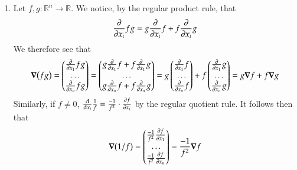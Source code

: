 \documentclass[12pt]{article}
\theoremstyle{definitionstyle}
\def\mbb#1{\mathbb{#1}}
\def \R{\mbb{R}}
\begin{document}
\begin{enumerate}[leftmargin=\labelsep]
		
		\item Let $f, g: \R^n \to \R$. We notice, by the regular product rule, that
		\begin{align*}
			\pdv{x_i} fg = g\pdv{x_i} f + f \pdv{x_i}g
		\end{align*}
		We therefore see that
		\begin{align*}
			\grad(fg) = \begin{pmatrix}
				\pdv{x_1} fg \\
				\ldots \\
				\pdv{x_n} fg
			\end{pmatrix} = \begin{pmatrix}
				g\pdv{x_1} f + f \pdv{x_1}g \\
				\ldots \\
				g \pdv{x_n}f + f \pdv{x_n} g
			\end{pmatrix} = g\begin{pmatrix}
				\pdv{x_1} f \\
				\ldots \\
				\pdv{x_n} f
			\end{pmatrix} + f \begin{pmatrix}
				\pdv{x_1} g \\
				\ldots \\
				\pdv{x_n} g
			\end{pmatrix}
			= g \grad f + f \grad g
		\end{align*}
		Similarly, if $f \neq 0$, $\dv{x_i} \frac1f = \frac{-1}{f^2} \cdot \pdv{f}{x_i}$ by the regular quotient rule. It follows then that
		\begin{align*}
			\grad(1/f) = \begin{pmatrix}
				\frac{-1}{f^2} \pdv{f}{x_1} \\
				\ldots \\
				\frac{-1}{f^2} \pdv{f}{x_n}
			\end{pmatrix}
			= \frac{-1}{f^2} \grad f
		\end{align*}
	

\end{enumerate}
\end{document}
